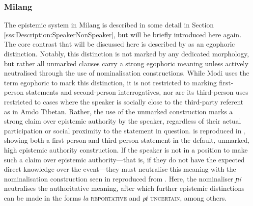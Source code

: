 \subsubsection{Milang}\label{sss:Discussion:MilangCase}
The epistemic system in Milang is described in some detail in Section \ref{sss:Description:SpeakerNonSpeaker}, but will be briefly introduced here again. The core contrast that will be discussed here is described by  as an egophoric distinction. Notably, this distinction is not marked by any dedicated morphology, but rather all unmarked clauses carry a strong egophoric meaning unless actively neutralised through the use of nominalisation constructions.  While Modi uses the term egophoric to mark this distinction, it is not restricted to marking first-person statements and second-person interrogatives, nor are its third-person uses restricted to cases where the speaker is socially close to the third-party referent as in Amdo Tibetan. Rather, the use of the unmarked construction marks a strong claim over epistemic authority by the speaker, regardless of their actual participation or social proximity to the statement in question.  is reproduced in , showing both a first person and third person statement in the default, unmarked, high epistemic authority construction. If the speaker is not in a position to make such a claim over epistemic authority---that is, if they do not have the expected direct knowledge over the event---they must neutralise this meaning with the nominalisation construction seen in  reproduced from . Here, the nominaliser \textit{ɲi} neutralises the authoritative meaning, after which further epistemic distinctions can be made in the forms \textit{la} \textsc{reportative} and \textit{pɨ} \textsc{uncertain}, among others.

